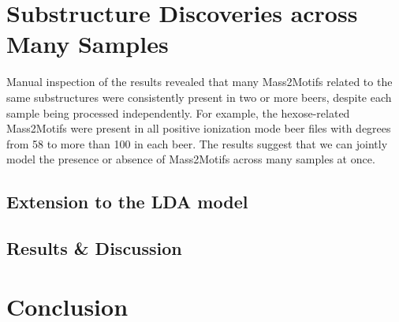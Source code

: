\section{Substructure Discoveries across Many Samples}

Manual inspection of the results revealed that many Mass2Motifs related to the same substructures were consistently present in two or more beers, despite each sample being processed independently. For example, the hexose-related Mass2Motifs were present in all positive ionization mode beer files with degrees from 58 to more than 100 in each beer. The results suggest that we can jointly model the presence or absence of Mass2Motifs across many samples at once.

\subsection{Extension to the LDA model}

\subsection{Results \& Discussion}

\section{Conclusion}